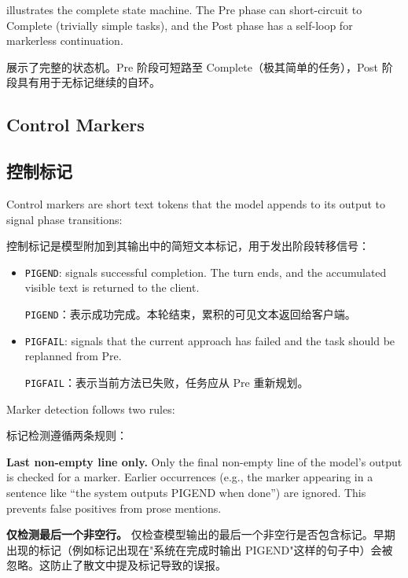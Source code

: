  illustrates the complete state machine. The Pre phase can short-circuit to Complete (trivially simple tasks), and the Post phase has a self-loop for markerless continuation.
\begin{chinese}
 展示了完整的状态机。Pre 阶段可短路至 Complete（极其简单的任务），Post 阶段具有用于无标记继续的自环。
\end{chinese}

\subsection{Control Markers}
\label{sec:markers}
\begin{chinese}
\subsection{控制标记}
\end{chinese}

Control markers are short text tokens that the model appends to its output to signal phase transitions:
\begin{chinese}
控制标记是模型附加到其输出中的简短文本标记，用于发出阶段转移信号：
\end{chinese}

\begin{itemize}[nosep]
    \item \texttt{PIGEND}: signals successful completion. The turn ends, and the accumulated visible text is returned to the client.
    \begin{chinese}
    \texttt{PIGEND}：表示成功完成。本轮结束，累积的可见文本返回给客户端。
    \end{chinese}
    \item \texttt{PIGFAIL}: signals that the current approach has failed and the task should be replanned from Pre.
    \begin{chinese}
    \texttt{PIGFAIL}：表示当前方法已失败，任务应从 Pre 重新规划。
    \end{chinese}
\end{itemize}

Marker detection follows two rules:
\begin{chinese}
标记检测遵循两条规则：
\end{chinese}

\textbf{Last non-empty line only.} Only the final non-empty line of the model's output is checked for a marker. Earlier occurrences (e.g., the marker appearing in a sentence like ``the system outputs PIGEND when done'') are ignored. This prevents false positives from prose mentions.
\begin{chinese}
\textbf{仅检测最后一个非空行。} 仅检查模型输出的最后一个非空行是否包含标记。早期出现的标记（例如标记出现在"系统在完成时输出 PIGEND"这样的句子中）会被忽略。这防止了散文中提及标记导致的误报。
\end{chinese}

